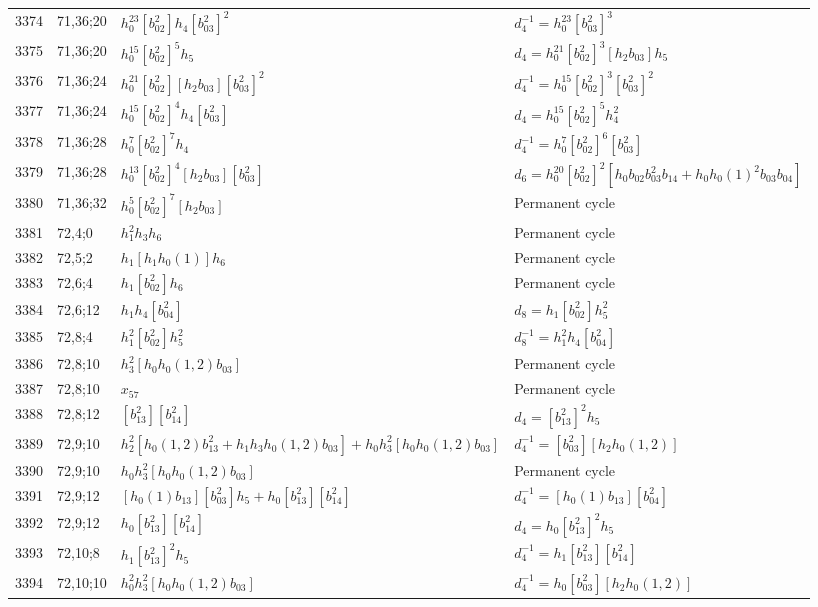 \documentclass{article}
\begin{document}
\begin{longtable}{|l|l|>{\raggedright\arraybackslash}p{6cm}|>{\raggedright\arraybackslash}p{6cm}|}
\hline
3374 & 71,36;20 & $h_0^{23}[b_{02}^2]h_4[b_{03}^2]^2$ & $d_{4}^{-1}=h_0^{23}[b_{03}^2]^3$\\
3375 & 71,36;20 & $h_0^{15}[b_{02}^2]^5h_5$ &$d_{4}=h_0^{21}[b_{02}^2]^3[h_2b_{03}]h_5$\\
\hline
3376 & 71,36;24 & $h_0^{21}[b_{02}^2][h_2b_{03}][b_{03}^2]^2$ & $d_{4}^{-1}=h_0^{15}[b_{02}^2]^3[b_{03}^2]^2$\\
3377 & 71,36;24 & $h_0^{15}[b_{02}^2]^4h_4[b_{03}^2]$ &$d_{4}=h_0^{15}[b_{02}^2]^5h_4^2$\\
\hline
3378 & 71,36;28 & $h_0^7[b_{02}^2]^7h_4$ & $d_{4}^{-1}=h_0^7[b_{02}^2]^6[b_{03}^2]$\\
3379 & 71,36;28 & $h_0^{13}[b_{02}^2]^4[h_2b_{03}][b_{03}^2]$ &$d_{6}=h_0^{20}[b_{02}^2]^2[h_0b_{02}b_{03}^2b_{14} + h_0h_0(1)^2b_{03}b_{04}]$\\
\hline
3380 & 71,36;32 & $h_0^5[b_{02}^2]^7[h_2b_{03}]$ & Permanent cycle\\
\hline
3381 & 72,4;0 & $h_1^2h_3h_6$ & Permanent cycle\\
\hline
3382 & 72,5;2 & $h_1[h_1h_0(1)]h_6$ & Permanent cycle\\
\hline
3383 & 72,6;4 & $h_1[b_{02}^2]h_6$ & Permanent cycle\\
\hline
3384 & 72,6;12 & $h_1h_4[b_{04}^2]$ &$d_{8}=h_1[b_{02}^2]h_5^2$\\
\hline
3385 & 72,8;4 & $h_1^2[b_{02}^2]h_5^2$ & $d_{8}^{-1}=h_1^2h_4[b_{04}^2]$\\
\hline
3386 & 72,8;10 & $h_3^2[h_0h_0(1, 2)b_{03}]$ & Permanent cycle\\
3387 & 72,8;10 & $x_{57}$ & Permanent cycle\\
\hline
3388 & 72,8;12 & $[b_{13}^2][b_{14}^2]$ &$d_{4}=[b_{13}^2]^2h_5$\\
\hline
3389 & 72,9;10 & $h_2^2[h_0(1, 2)b_{13}^2 + h_1h_3h_0(1, 2)b_{03}] + h_0h_3^2[h_0h_0(1, 2)b_{03}]$ & $d_{4}^{-1}=[b_{03}^2][h_2h_0(1, 2)]$\\
3390 & 72,9;10 & $h_0h_3^2[h_0h_0(1, 2)b_{03}]$ & Permanent cycle\\
\hline
3391 & 72,9;12 & $[h_0(1)b_{13}][b_{03}^2]h_5 + h_0[b_{13}^2][b_{14}^2]$ & $d_{4}^{-1}=[h_0(1)b_{13}][b_{04}^2]$\\
3392 & 72,9;12 & $h_0[b_{13}^2][b_{14}^2]$ &$d_{4}=h_0[b_{13}^2]^2h_5$\\
\hline
3393 & 72,10;8 & $h_1[b_{13}^2]^2h_5$ & $d_{4}^{-1}=h_1[b_{13}^2][b_{14}^2]$\\
\hline
3394 & 72,10;10 & $h_0^2h_3^2[h_0h_0(1, 2)b_{03}]$ & $d_{4}^{-1}=h_0[b_{03}^2][h_2h_0(1, 2)]$\\

\end{longtable}
\end{document}
